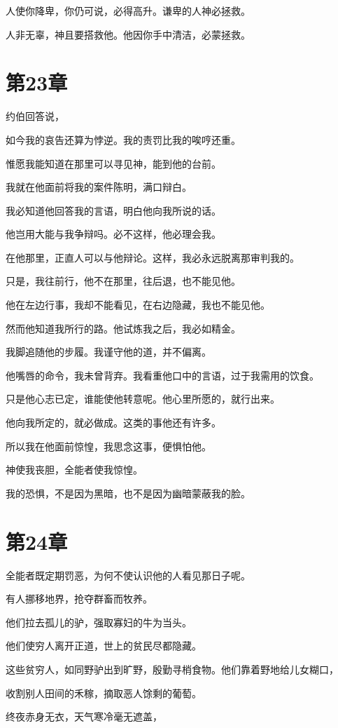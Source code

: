 \documentclass[12pt,oneside]{book}
\begin{document}
人使你降卑，你仍可说，必得高升。谦卑的人神必拯救。

人非无辜，神且要搭救他。他因你手中清洁，必蒙拯救。


\chapter{第23章}
约伯回答说，

如今我的哀告还算为悖逆。我的责罚比我的唉哼还重。

惟愿我能知道在那里可以寻见神，能到他的台前。

我就在他面前将我的案件陈明，满口辩白。

我必知道他回答我的言语，明白他向我所说的话。

他岂用大能与我争辩吗。必不这样，他必理会我。

在他那里，正直人可以与他辩论。这样，我必永远脱离那审判我的。

只是，我往前行，他不在那里，往后退，也不能见他。

他在左边行事，我却不能看见，在右边隐藏，我也不能见他。

然而他知道我所行的路。他试炼我之后，我必如精金。

我脚追随他的步履。我谨守他的道，并不偏离。

他嘴唇的命令，我未曾背弃。我看重他口中的言语，过于我需用的饮食。

只是他心志已定，谁能使他转意呢。他心里所愿的，就行出来。

他向我所定的，就必做成。这类的事他还有许多。

所以我在他面前惊惶，我思念这事，便惧怕他。

神使我丧胆，全能者使我惊惶。

我的恐惧，不是因为黑暗，也不是因为幽暗蒙蔽我的脸。


\chapter{第24章}
全能者既定期罚恶，为何不使认识他的人看见那日子呢。

有人挪移地界，抢夺群畜而牧养。

他们拉去孤儿的驴，强取寡妇的牛为当头。

他们使穷人离开正道，世上的贫民尽都隐藏。

这些贫穷人，如同野驴出到旷野，殷勤寻梢食物。他们靠着野地给儿女糊口，

收割别人田间的禾稼，摘取恶人馀剩的葡萄。

终夜赤身无衣，天气寒冷毫无遮盖，
\end{document}
